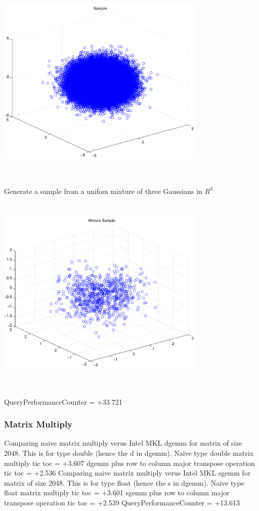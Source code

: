 \documentclass[9pt]{article}
\theoremstyle{plain}
\theoremstyle{definition}
\theoremstyle{remark}
\numberwithin{equation}{section}
\begin{document}
\includegraphics[width=10.0cm,height=10.0cm]{R_3_Normal.pdf}

Generate a sample from a unifom mixture of three Gaussians in $R^3$
\includegraphics[width=10.0cm,height=10.0cm]{R_3_Normal_Mixture.pdf}

QueryPerformanceCounter  =  +33.721
\subsubsection{Matrix Multiply}
Comparing naive matrix multiply verus Intel MKL dgemm for matrix of size 2048.
This is for type double (hence the d in dgemm).
Naive type double matrix multiply tic toc  =  +3.607
dgemm plus row to column major transpose operation tic toc  =  +2.536
Comparing naive matrix multiply verus Intel MKL sgemm for matrix of size 2048.
This is for type float (hence the s in dgemm).
Naive type float matrix multiply tic toc  =  +3.601
sgemm plus row to column major transpose operation tic toc  =  +2.539
QueryPerformanceCounter  =  +13.613
\end{document}
